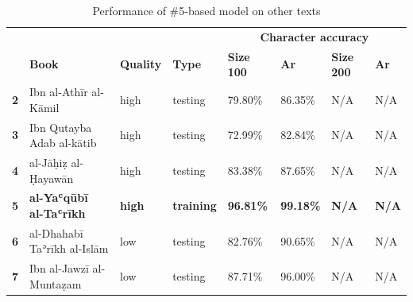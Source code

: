 \begin{subappendices}
\begin{table}[H]
\begin{minipage}{\textwidth}
\begin{center}
\caption{Performance of \#5-based model on other texts}
\label{tab:soa_atab4}
\renewcommand*{\thefootnote}{\alph{footnote}}
\begin{tabularx}{\textwidth}{lp{2.2cm}XXXXXX} \toprule
& & & & \multicolumn{4}{c}{\textbf{Character accuracy}}\\
\cline{5-8}
& \textbf{Book}& \textbf{Quality} & \textbf{Type} & \textbf{Size 100} & \textbf{Ar}& \textbf{Size 200} & \textbf{Ar}\\ \midrule
\textbf{2} & Ibn al-Athīr \newline\scriptsize{al-Kāmil} &  	  high& testing & 79.80\% & 86.35\% & N/A & N/A\\
\textbf{3} & Ibn Qutayba \newline\scriptsize{Adab al-kātib} & high& testing	& 72.99\% & 82.84\% & N/A & N/A \\
\textbf{4} & al-Jāḥiẓ \newline\scriptsize{al-Ḥayawān} & 	  high& testing & 83.38\% & 87.65\% & N/A & N/A\\
\textbf{5} & \textbf{al-Yaʿqūbī \newline\scriptsize{al-Taʿrīkh}} & 	  \textbf{high} & \textbf{training} & \textbf{96.81\%} & \textbf{99.18\%} & \textbf{N/A} & \textbf{N/A}\\
\textbf{6} & al-Dhahabī \newline\scriptsize{Taʾrīkh al-Islām}  & low& testing	& 82.76\% & 90.65\% & N/A & N/A\\
\textbf{7} & Ibn al-Jawzī \newline\scriptsize{al-Muntaẓam} &    low& testing & 87.71\% & 96.00\% & N/A & N/A\\
\bottomrule
\end{tabularx}
\end{center}
\end{minipage}
\end{table}
\end{subappendices}

